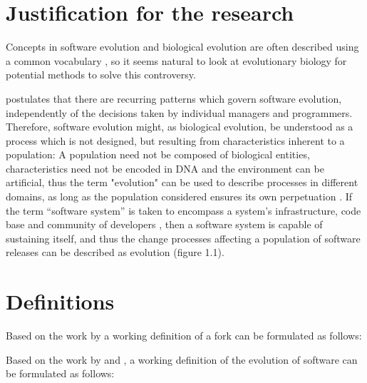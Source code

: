 
\section{Justification for the research}

Concepts in software evolution and biological evolution are often described using a common vocabulary \citep{Yu2006a}, so it seems natural to look at evolutionary biology for potential methods to solve this controversy.

\citet{Lehman1980a} postulates that there are recurring patterns which govern software evolution, independently of the decisions taken by individual managers and programmers. Therefore, software evolution might, as biological evolution, be understood as a process which is not designed, but resulting from characteristics inherent to a population: A population need not be composed of biological entities, characteristics need not be encoded in DNA and the environment can be artificial, thus the term "evolution" can be used to describe processes in different domains, as long as the population considered ensures its own perpetuation \citep{Nehaniv2006a}. If the term “software system” is taken to encompass a system's infrastructure, code base and community of developers \citep{Yu2006a}, then a software system is capable of sustaining itself, and thus the change processes affecting a population of software releases can be described as evolution (figure 1.1).


\section{Definitions}

Based on the work by \citet{Robles2012a} a working definition of a fork can be formulated as follows:


\noindent
Based on the work by \citet{Nehaniv2006a} and \citet{Yu2006a}, a working definition of the evolution of software can be formulated as follows:


